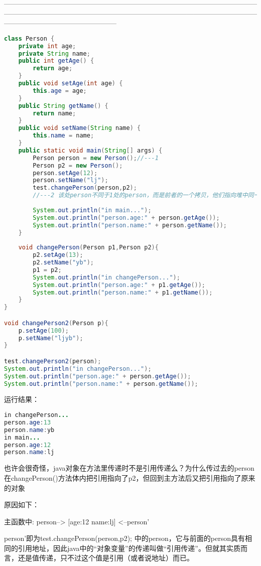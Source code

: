 \documentclass[10pt,b5paper]{article}
\begin{document}
————————————————————————————————————————————————————————————————————————————————————————
\begin{lstlisting}[language=java]
class Person {  
    private int age;  
    private String name;  
    public int getAge() {  
        return age;  
    }  
    public void setAge(int age) {  
        this.age = age;  
    }  
    public String getName() {  
        return name;  
    }  
    public void setName(String name) {  
        this.name = name;  
    }  
    public static void main(String[] args) {  
        Person person = new Person();//---1
        Person p2 = new Person();  
        person.setAge(12);  
        person.setName("lj");  
        test.changePerson(person,p2);
        //---2 该处person不同于1处的person，而是前者的一个拷贝，他们指向堆中同一个对象
        
        System.out.println("in main...");  
        System.out.println("person.age:" + person.getAge());  
        System.out.println("person.name:" + person.getName());  
    }
    
    void changePerson(Person p1,Person p2){  
        p2.setAge(13);  
        p2.setName("yb");  
        p1 = p2;  
        System.out.println("in changePerson...");  
        System.out.println("person.age:" + p1.getAge());  
        System.out.println("person.name:" + p1.getName());  
    }  
}

void changePerson2(Person p){  
    p.setAge(100);  
    p.setName("ljyb");  
}

test.changePerson2(person);  
System.out.println("in changePerson...");  
System.out.println("person.age:" + person.getAge());  
System.out.println("person.name:" + person.getName()); 

\end{lstlisting}
运行结果： 
\begin{lstlisting}[language=java]
in changePerson... 
person.age:13 
person.name:yb 
in main... 
person.age:12 
person.name:lj 
\end{lstlisting}
也许会很奇怪，java对象在方法里传递时不是引用传递么？为什么传过去的person在changePerson()方法体内把引用指向了p2，但回到主方法后又把引用指向了原来的对象 

原因如下： 

主函数中: person--> [age:12 name:lj] <--person’ 

person'即为test.changePerson(person,p2); 中的person，它与前面的person具有相同的引用地址，因此java中的“对象变量”的传递叫做“引用传递”。但就其实质而言，还是值传递，只不过这个值是引用（或者说地址）而已。 
\end{document}
